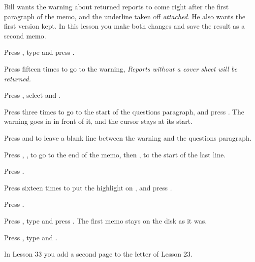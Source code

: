 Bill wants the warning about returned reports to come right after the first
paragraph of the memo, and the underline taken off \textit{attached}.  He
also wants the first version kept.  In this lesson you make both changes and
save the result as a second memo.

\begin{WPSteps}
\item Press , type  and press
.
\item Press 
fifteen times to go to the warning, \textit{Reports without a cover sheet
will be returned.}
\item Press , select  and
.
\item Press  three times to go to the start of the
questions paragraph, and press .  The warning goes in in
front of it, and the cursor stays at its start.
\item Press  and  to leave a blank line between
the warning and the questions paragraph.
\end{WPSteps}

\begin{WPSteps}
\item Press , ,  to go to the end
of the memo, then ,  to the start of the last
line.
\item Press .
\item Press 
sixteen times to put the highlight on \Code{[UND]}, and press
.
\end{WPSteps}

\begin{WPSteps}
\item Press .
\item Press , type  and press
.  The first memo stays on the disk as it was.
\item Press , type  and .
\end{WPSteps}
\EndReplay
In Lesson 33 you add a second page to the letter of Lesson 23.
